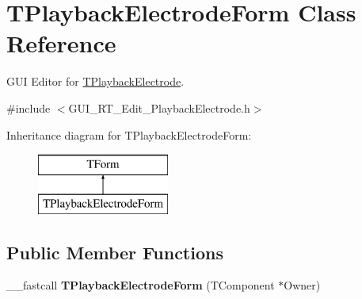 \hypertarget{class_t_playback_electrode_form}{\section{T\+Playback\+Electrode\+Form Class Reference}
\label{class_t_playback_electrode_form}
}


G\+U\+I Editor for \hyperlink{class_t_playback_electrode}{T\+Playback\+Electrode}.  




{\ttfamily \#include $<$G\+U\+I\+\_\+\+R\+T\+\_\+\+Edit\+\_\+\+Playback\+Electrode.\+h$>$}

Inheritance diagram for T\+Playback\+Electrode\+Form\+:\begin{figure}[H]
\begin{center}
\leavevmode
\includegraphics[height=2.000000cm]{class_t_playback_electrode_form}
\end{center}
\end{figure}
\subsection*{Public Member Functions}
\begin{DoxyCompactItemize}
\item 
\hypertarget{class_t_playback_electrode_form_ae6af233c1a9cae8ba4da4fbcd49a8409}{\+\_\+\+\_\+fastcall {\bfseries T\+Playback\+Electrode\+Form} (T\+Component $\ast$Owner)}\label{class_t_playback_electrode_form_ae6af233c1a9cae8ba4da4fbcd49a8409}

\end{DoxyCompactItemize}
